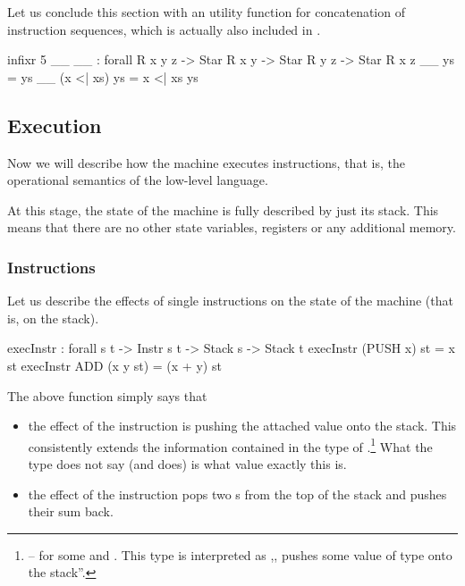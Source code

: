 Let us conclude this section with an utility function for concatenation of
instruction sequences, which is actually also included in .

\begin{code}
  infixr 5 _\app_
  _\app_ : forall {R x y z} -> Star R x y -> Star R y z -> Star R x z
  _\app_ \nil ys = ys
  _\app_ (x <| xs) ys = x <| xs \app ys
\end{code}

\subsection{Execution}

Now we will describe how the machine executes instructions, that is,
the operational semantics of the low-level language.

At this stage, the state of the machine is fully described by just its stack. This
means that there are no other state variables, registers or any additional
memory.

\subsubsection{Instructions}

Let us describe the effects of single instructions on the state of the machine
(that is, on the stack).

\begin{code}
  execInstr : forall {s t} -> Instr s t -> Stack s -> Stack t
  execInstr (PUSH x) st = x \scons st
  execInstr ADD (x \scons y \scons st) = (x + y) \scons st
\end{code}

\noindent The above function simply says that
\begin{itemize}
  \item the effect of the instruction  is pushing the attached
    value onto the stack. This consistently extends the information contained
    in the type of .\footnote{ -- for
    some  and . This type is interpreted as ,,
    pushes some value of type  onto the stack''.}
    What the type does not say (and 
    does) is what value exactly this is.
  \item the effect of the instruction  pops two s from
    the top of the stack and pushes their sum back.
\end{itemize}

